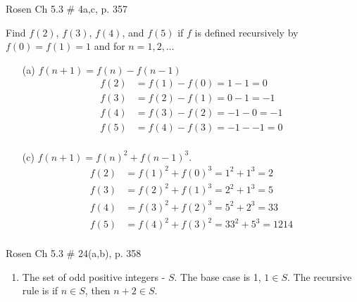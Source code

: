 \documentclass[12pt,addpoints]{exam}
\begin{document}
\begin{questions}
\question[8] Rosen Ch 5.3 \# 4a,c, p. 357
    \ifprintanswers
        \vspace{-10pt}
   \fi
\begin{solution}
Find $f(2)$, $f(3)$, $f(4)$, and $f(5)$ if $f$ is defined
recursively by $f(0) = f(1) = 1$ and for $n=1,2,\ldots$
\begin{itemize}
    \item[(a)] $f(n+1) = f(n) - f(n-1)$
    \begin{align*}
        f(2) &= f(1) - f(0) = 1 - 1 = 0 \\
        f(3) &= f(2) - f(1) = 0 - 1 = -1 \\
        f(4) &= f(3) - f(2) = -1 - 0 = -1 \\
        f(5) &= f(4) - f(3) = -1 - -1 = 0 \\
    \end{align*}
    \item[(c)] $f(n+1) = f(n)^2 + f(n-1)^3$.
    \begin{align*}
        f(2) &= f(1)^2 + f(0)^3 = 1^2 + 1^3 = 2 \\
        f(3) &= f(2)^2 + f(1)^3 = 2^2 + 1^3 = 5 \\
        f(4) &= f(3)^2 + f(2)^3 = 5^2 + 2^3 = 33 \\
        f(5) &= f(4)^2 + f(3)^2 = 33^2 + 5^3 = 1214 \\
    \end{align*}
\end{itemize}
\end{solution}


\question[6] Rosen Ch 5.3 \# 24(a,b), p. 358
    \ifprintanswers
        \vspace{-10pt}
   \fi
\begin{solution}
\begin{enumerate}[label=(\alph*),itemsep=0pt,parsep=0pt,topsep=0pt]
    \item The set of odd positive integers - $S$.  The base case is 1, $1 \in S$.  The recursive rule is if $n \in S$, then $n+2 \in S$.


\end{enumerate}
\end{solution}
\end{questions}
\end{document}
